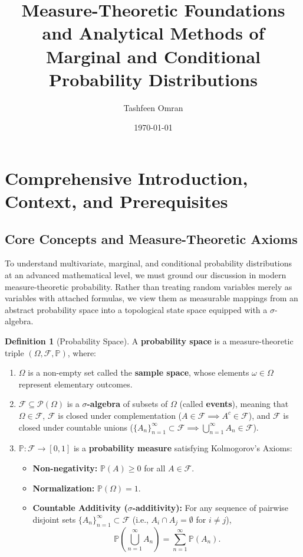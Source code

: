 \documentclass[11pt, letterpaper]{article}
\title{\textbf{Measure-Theoretic Foundations and Analytical Methods of Marginal and Conditional Probability Distributions}}
\author{Tashfeen Omran}
\date{\today}
\theoremstyle{definition}
\newtheorem{definition}{Definition}[section]
\theoremstyle{remark}
\newcommand{\Prob}{\mathbb{P}}
\newcommand{\F}{\mathcal{F}}
\begin{document}
\maketitle
\tableofcontents
\newpage

\section{Comprehensive Introduction, Context, and Prerequisites}

\subsection{Core Concepts and Measure-Theoretic Axioms}

To understand multivariate, marginal, and conditional probability distributions at an advanced mathematical level, we must ground our discussion in modern measure-theoretic probability. Rather than treating random variables merely as variables with attached formulas, we view them as measurable mappings from an abstract probability space into a topological state space equipped with a $\sigma$-algebra.

\begin{definition}[Probability Space]
A \textbf{probability space} is a measure-theoretic triple $(\Omega, \F, \Prob)$, where:
\begin{enumerate}[label=(\roman*)]
    \item $\Omega$ is a non-empty set called the \textbf{sample space}, whose elements $\omega \in \Omega$ represent elementary outcomes.
    \item $\F \subseteq \mathcal{P}(\Omega)$ is a \textbf{$\sigma$-algebra} of subsets of $\Omega$ (called \textbf{events}), meaning that $\Omega \in \F$, $\F$ is closed under complementation ($A \in \F \implies A^c \in \F$), and $\F$ is closed under countable unions ($\{A_n\}_{n=1}^\infty \subset \F \implies \bigcup_{n=1}^\infty A_n \in \F$).
    \item $\Prob : \F \to [0, 1]$ is a \textbf{probability measure} satisfying Kolmogorov's Axioms:
    \begin{itemize}
        \item \textbf{Non-negativity:} $\Prob(A) \ge 0$ for all $A \in \F$.
        \item \textbf{Normalization:} $\Prob(\Omega) = 1$.
        \item \textbf{Countable Additivity ($\sigma$-additivity):} For any sequence of pairwise disjoint sets $\{A_n\}_{n=1}^\infty \subset \F$ (i.e., $A_i \cap A_j = \emptyset$ for $i \neq j$),
        \[ \Prob\left(\bigcup_{n=1}^\infty A_n\right) = \sum_{n=1}^\infty \Prob(A_n). \]
    \end{itemize}
\end{enumerate}
\end{definition}
\end{document}
